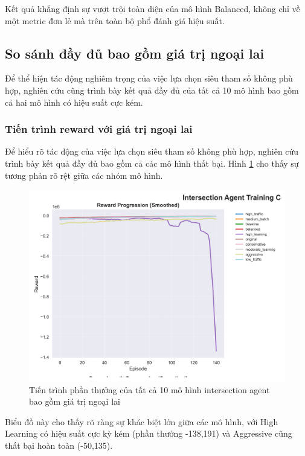 Kết quả khẳng định sự vượt trội toàn diện của mô hình Balanced, không chỉ về một metric đơn lẻ mà trên toàn bộ phổ đánh giá hiệu suất.

\subsection{So sánh đầy đủ bao gồm giá trị ngoại lai}

Để thể hiện tác động nghiêm trọng của việc lựa chọn siêu tham số không phù hợp,
nghiên cứu cũng trình bày kết quả đầy đủ của tất cả 10 mô hình bao gồm cả hai mô
hình có hiệu suất cực kém.

\subsubsection{Tiến trình reward với giá trị ngoại lai}
Để hiểu rõ tác động của việc lựa chọn siêu tham số không phù hợp, nghiên cứu trình bày kết quả đầy đủ bao gồm cả các mô hình thất bại. Hình \ref{fig:intersection_full_reward_progress} cho thấy sự tương phản rõ rệt giữa các nhóm mô hình.

\begin{figure}[!htp]
    \centering
    \includegraphics[width=\textwidth]{
        figures/individual_plots/intersection_full_reward_progress.png
    }
    \caption{Tiến trình phần thưởng của tất cả 10 mô hình intersection agent bao gồm giá trị ngoại lai}
    \label{fig:intersection_full_reward_progress}
\end{figure}

Biểu đồ này cho thấy rõ ràng sự khác biệt lớn giữa các mô hình, với High Learning có hiệu suất cực kỳ kém (phần thưởng -138,191) và Aggressive cũng thất bại hoàn toàn (-50,135).

